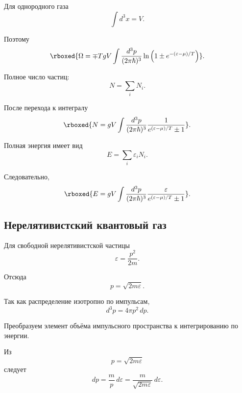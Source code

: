 \documentclass[../final.tex]{subfiles}
\begin{document}
Для однородного газа
%
\begin{equation*}
    \int d^3x
    =
    V.
\end{equation*}

Поэтому
%
\[
    \rboxed{
        \Omega
        =
        \mp
        TgV
        \int
        \frac{d^3p}{(2\pi\hbar)^3}
        \ln
        \left(
            1
            \pm
            e^{-(\varepsilon-\mu)/T}
        \right)
    }.
\]

Полное число частиц:
%
\begin{equation*}
    N
    =
    \sum_i
    N_i.
\end{equation*}

После перехода к интегралу
%
\[
    \rboxed{
        N
        =
        gV
        \int
        \frac{d^3p}{(2\pi\hbar)^3}
        \frac{1}{
            e^{(\varepsilon-\mu)/T}\pm1
        }
    }.
\]

Полная энергия имеет вид
%
\begin{equation*}
    E
    =
    \sum_i
    \varepsilon_iN_i.
\end{equation*}

Следовательно,
%
\[
    \rboxed{
        E
        =
        gV
        \int
        \frac{d^3p}{(2\pi\hbar)^3}
        \frac{\varepsilon}{
            e^{(\varepsilon-\mu)/T}\pm1
        }
    }.
\]


\subsection{Нерелятивистский квантовый газ}

Для свободной нерелятивистской частицы
%
\begin{equation*}
    \varepsilon
    =
    \frac{p^2}{2m}.
\end{equation*}

Отсюда
%
\begin{equation*}
    p
    =
    \sqrt{2m\varepsilon}.
\end{equation*}

Так как распределение изотропно по импульсам,
%
\begin{equation*}
    d^3p
    =
    4\pi p^2\,dp.
\end{equation*}

Преобразуем элемент объёма импульсного пространства
к интегрированию по энергии.

Из
%
\begin{equation*}
    p
    =
    \sqrt{2m\varepsilon}
\end{equation*}
%
следует
%
\begin{equation*}
    dp
    =
    \frac{m}{p}\,d\varepsilon
    =
    \frac{m}{
        \sqrt{2m\varepsilon}
    }
    \,d\varepsilon.
\end{equation*}
\end{document}

